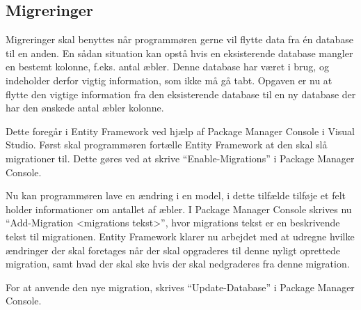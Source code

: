 \subsection{Migreringer}
\label{sub:migreringer}

Migreringer skal benyttes når programmøren gerne vil flytte data fra én database til en anden. En sådan situation kan opstå hvis en eksisterende database mangler en bestemt kolonne, f.eks. antal æbler. Denne database har været i brug, og indeholder derfor vigtig information, som ikke må gå tabt. Opgaven er nu at flytte den vigtige information fra den eksisterende database til en ny database der har den ønskede antal æbler kolonne.

Dette foregår i Entity Framework ved hjælp af Package Manager Console i Visual Studio. Først skal programmøren fortælle Entity Framework at den skal slå migrationer til. Dette gøres ved at skrive \enquote{Enable-Migrations} i Package Manager Console.

Nu kan programmøren lave en ændring i en model, i dette tilfælde tilføje et felt holder informationer om antallet af æbler. I Package Manager Console skrives nu \enquote{Add-Migration <migrations tekst>}, hvor migrations tekst er en beskrivende tekst til migrationen. Entity Framework klarer nu arbejdet med at udregne hvilke ændringer der skal foretages når der skal opgraderes til denne nyligt oprettede migration, samt hvad der skal ske hvis der skal nedgraderes fra denne migration.

For at anvende den nye migration, skrives \enquote{Update-Database} i Package Manager Console.
